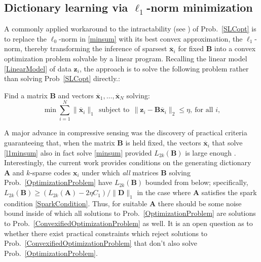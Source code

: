 \subsection{Dictionary learning via $\ell_1$-norm minimization}

A commonly applied workaround to the intractability (see \cite{tillmann2015computational}) of Prob.~\ref{SLCopt} is to replace the $\ell_0$-norm in \eqref{minsum} with its best convex approximation, the $\ell_1$-norm, thereby transforming the inference of sparsest $\mathbf{\overline x}_i$ for fixed $\mathbf{B}$ into a convex optimization problem solvable by a linear program. Recalling the linear model \eqref{LinearModel} of data $\mathbf{z}_i$, the approach is to solve the following problem rather than solving Prob~\ref{SLCopt} directly.:

\begin{problem}\label{ConvexifiedOptimizationProblem}
Find a matrix $\mathbf{B}$ and vectors \mbox{$\mathbf{\overline x}_1, \ldots, \mathbf{\overline x}_N$} solving:
\begin{equation}\label{l1minsum}
\min \sum_{i = 1}^N \|\mathbf{\overline x}_{i}\|_1 \ \
\text{subject to} \ \ \|\mathbf{z}_i - \mathbf{B}\mathbf{\overline x}_i\|_2 \leq \eta, \ \text{for all $i$},
\end{equation}
\end{problem}


A major advance in compressive sensing was the discovery of practical criteria guaranteeing that, when the matrix $\mathbf{B}$ is held fixed, the vectors $\mathbf{\overline x}_i$ that solve \eqref{l1minsum} also in fact solve \eqref{minsum} provided $L_{2k}(\mathbf{B})$ is large enough \cite{eldar2012compressed}. Interestingly, the current work provides conditions on the generating dictionary $\mathbf{A}$ and $k$-sparse codes $\mathbf{x}_i$ under which \emph{all} matrices $\mathbf{B}$ solving Prob.~\ref{OptimizationProblem} have $L_{2k}(\mathbf{B})$ bounded from below; specifically, $L_{2k}(\mathbf{B}) \geq \left(L_{2k}(\mathbf{A}) - 2\eta C_1 \right) / \|\mathbf{D}\|_1$ in the case where $\mathbf{A}$ satisfies the spark condition \eqref{SparkCondition}. Thus, for suitable $\mathbf{A}$ there should be some noise bound inside of which all solutions to Prob.~\ref{OptimizationProblem} are solutions to Prob.~\ref{ConvexifiedOptimizationProblem} as well. It is an open question as to whether there exist practical constraints which reject solutions to Prob.~\ref{ConvexifiedOptimizationProblem} that don't also solve Prob.~\ref{OptimizationProblem}.

